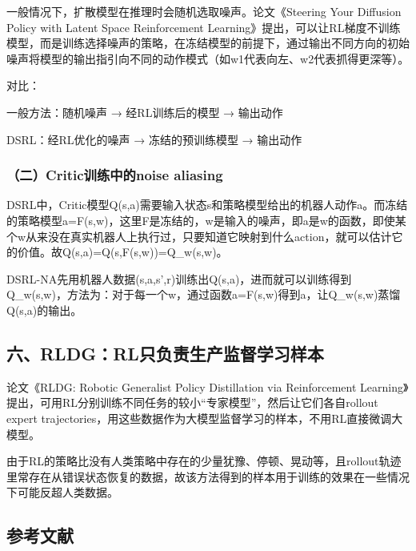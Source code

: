 一般情况下，扩散模型在推理时会随机选取噪声。论文《Steering Your Diffusion Policy with Latent Space Reinforcement Learning》提出，可以让RL梯度不训练模型，而是训练选择噪声的策略，在冻结模型的前提下，通过输出不同方向的初始噪声将模型的输出指引向不同的动作模式（如w1代表向左、w2代表抓得更深等）。

对比：

一般方法：随机噪声 → 经RL训练后的模型 → 输出动作

DSRL：经RL优化的噪声 → 冻结的预训练模型 → 输出动作

\hypertarget{ux4e8ccriticux8badux7ec3ux4e2dux7684noise-aliasing}{%
\subsubsection{（二）Critic训练中的noise aliasing}\label{ux4e8ccriticux8badux7ec3ux4e2dux7684noise-aliasing}}

DSRL中，Critic模型Q(s,a)需要输入状态s和策略模型给出的机器人动作a。而冻结的策略模型a=F(s,w)，这里F是冻结的，w是输入的噪声，即a是w的函数，即使某个w从来没在真实机器人上执行过，只要知道它映射到什么action，就可以估计它的价值。故Q(s,a)=Q(s,F(s,w))=Q\_w(s,w)。

DSRL-NA先用机器人数据(s,a,s',r)训练出Q(s,a)，进而就可以训练得到Q\_w(s,w)，方法为：对于每一个w，通过函数a=F(s,w)得到a，让Q\_w(s,w)蒸馏Q(s,a)的输出。

\hypertarget{ux516drldgrlux53eaux8d1fux8d23ux751fux4ea7ux76d1ux7763ux5b66ux4e60ux6837ux672c}{%
\subsection{六、RLDG：RL只负责生产监督学习样本}\label{ux516drldgrlux53eaux8d1fux8d23ux751fux4ea7ux76d1ux7763ux5b66ux4e60ux6837ux672c}}

论文《RLDG: Robotic Generalist Policy Distillation via Reinforcement Learning》提出，可用RL分别训练不同任务的较小``专家模型''，然后让它们各自rollout expert trajectories，用这些数据作为大模型监督学习的样本，不用RL直接微调大模型。

由于RL的策略比没有人类策略中存在的少量犹豫、停顿、晃动等，且rollout轨迹里常存在从错误状态恢复的数据，故该方法得到的样本用于训练的效果在一些情况下可能反超人类数据。

\FloatBarrier
{}
\hypertarget{ux53c2ux8003ux6587ux732e-153}{%
\subsection{参考文献}\label{ux53c2ux8003ux6587ux732e-153}}

